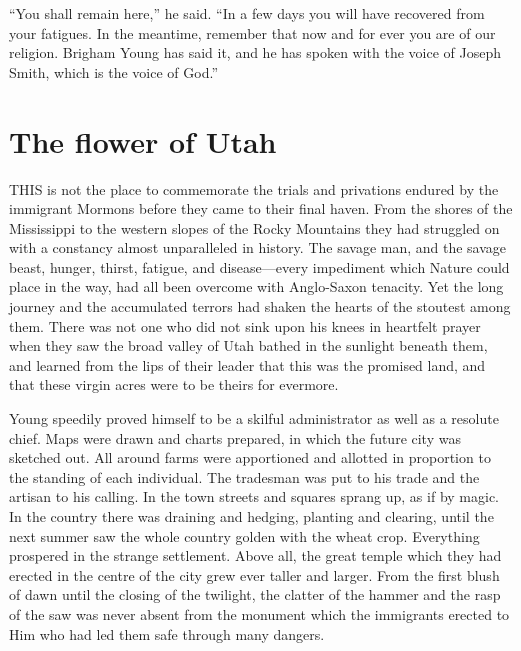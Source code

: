 \documentclass[12pt]{book}
\begin{document}
“You shall remain here,” he said. “In a few days you will have recovered from your fatigues. In the meantime, remember that now and for ever you are of our religion. Brigham Young has said it, and he has spoken with the voice of Joseph Smith, which is the voice of God.” 







\chapter{The flower of Utah} 

THIS is not the place to commemorate the trials and privations endured by the immigrant Mormons before they came to their final haven. From the shores of the Mississippi to the western slopes of the Rocky Mountains they had struggled on with a constancy almost unparalleled in history. The savage man, and the savage beast, hunger, thirst, fatigue, and disease—every impediment which Nature could place in the way, had all been overcome with Anglo-Saxon tenacity. Yet the long journey and the accumulated terrors had shaken the hearts of the stoutest among them. There was not one who did not sink upon his knees in heartfelt prayer when they saw the broad valley of Utah bathed in the sunlight beneath them, and learned from the lips of their leader that this was the promised land, and that these virgin acres were to be theirs for evermore. 

Young speedily proved himself to be a skilful administrator as well as a resolute chief. Maps were drawn and charts prepared, in which the future city was sketched out. All around farms were apportioned and allotted in proportion to the standing of each individual. The tradesman was put to his trade and the artisan to his calling. In the town streets and squares sprang up, as if by magic. In the country there was draining and hedging, planting and clearing, until the next summer saw the whole country golden with the wheat crop. Everything prospered in the strange settlement. Above all, the great temple which they had erected in the centre of the city grew ever taller and larger. From the first blush of dawn until the closing of the twilight, the clatter of the hammer and the rasp of the saw was never absent from the monument which the immigrants erected to Him who had led them safe through many dangers. 
\end{document}
